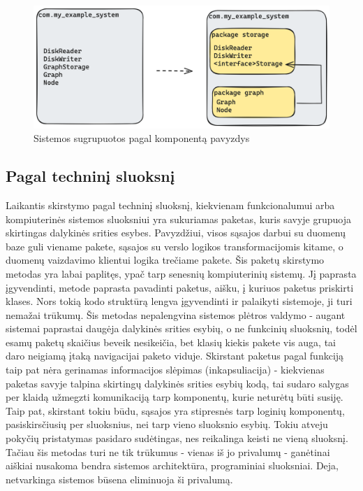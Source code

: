 \begin{figure}[H]
    \centering
    \includegraphics[scale=0.2]{img/component_packaging}
    \caption{Sistemos sugrupuotos pagal komponentą pavyzdys}
    \label{img:component_packaging}
\end{figure}


\subsection{Pagal techninį sluoksnį}
Laikantis skirstymo pagal techninį sluoksnį, kiekvienam funkcionalumui arba kompiuterinės sistemos sluoksniui yra sukuriamas paketas,
kuris savyje grupuoja skirtingas dalykinės srities esybes. Pavyzdžiui, visos sąsajos darbui su duomenų baze guli viename pakete, sąsajos
su verslo logikos transformacijomis kitame, o duomenų vaizdavimo klientui logika trečiame pakete.
Šis paketų skirstymo metodas yra labai paplitęs, ypač tarp senesnių kompiuterinių sistemų. Jį paprasta įgyvendinti,
metode paprasta pavadinti paketus, aišku, į kuriuos paketus priskirti klases. Nors tokią kodo struktūrą lengva įgyvendinti ir palaikyti sistemoje,
ji turi nemažai trūkumų. Šis metodas nepalengvina sistemos plėtros valdymo - augant sistemai paprastai daugėja dalykinės srities esybių,
o ne funkcinių sluoksnių, todėl esamų paketų skaičius beveik nesikeičia, bet klasių kiekis pakete vis auga, tai daro neigiamą įtaką navigacijai
paketo viduje. Skirstant paketus pagal funkciją taip pat nėra gerinamas informacijos slėpimas (inkapsuliacija) - kiekvienas paketas savyje
talpina skirtingų dalykinės srities esybių kodą, tai sudaro salygas per klaidą užmegzti komunikaciją tarp komponentų, kurie neturėtų būti susiję.
Taip pat, skirstant tokiu būdu, sąsajos yra stipresnės tarp loginių komponentų, pasiskirsčiusių per sluoksnius, nei tarp vieno sluoksnio esybių.
Tokiu atveju pokyčių pristatymas pasidaro sudėtingas, nes reikalinga keisti ne vieną sluoksnį.
Tačiau šis metodas turi ne tik trūkumus - vienas iš jo privalumų - ganėtinai aiškiai nusakoma bendra sistemos architektūra, programiniai sluoksniai.
Deja, netvarkinga sistemos būsena eliminuoja ši privalumą.

